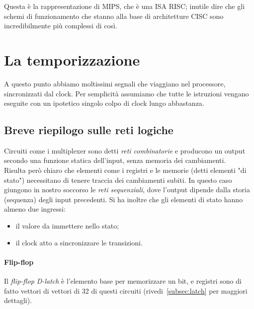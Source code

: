 \documentclass[class=book, crop=false, oneside]{standalone}
\begin{document}
Questa è la rappresentazione di MIPS, che è una ISA RISC; inutile dire che gli schemi di funzionamento che stanno alla base di architetture CISC sono incredibilmente più complessi di così.

\section{La temporizzazione}
A questo punto abbiamo moltissimi segnali che viaggiano nel processore, sincronizzati dal clock. Per semplicità assumiamo che tutte le istruzioni vengano eseguite con un ipotetico singolo colpo di clock lungo abbastanza.

\subsection{Breve riepilogo sulle reti logiche}
Circuiti come i multiplexer sono detti \emph{reti combinatorie} e producono un output secondo una funzione statica dell'input, senza memoria dei cambiamenti.\\
Risulta però chiaro che elementi come i registri e le memorie (detti elementi "di stato") necessitano di tenere traccia dei cambiamenti subiti. In questo caso giungono in nostro soccorso le \emph{reti sequenziali}, dove l'output dipende dalla storia (sequenza) degli input precedenti. Si ha inoltre che gli elementi di stato hanno almeno due ingressi:
\begin{itemize}
	\item il valore da immettere nello stato;
	\item il clock atto a sincronizzare le transizioni.
\end{itemize}

\paragraph{Flip-flop}
Il \emph{flip-flop D-latch} è l’elemento base per memorizzare un bit, e registri sono di fatto vettori di vettori di 32 di questi circuiti (rivedi~\ref{subsec:latch} per maggiori dettagli).
\end{document}
